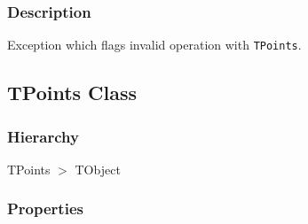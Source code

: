 \documentclass[12pt,a4paper,oneside]{report}
\newcommand{\code}[1]{\texttt{#1}}
\begin{document}
\subsubsection{Description}
Exception which flags invalid operation with \code{TPoints}.
 
\subsection{TPoints Class}
\label{lmPointsVec.TPoints}
\subsubsection{Hierarchy}
TPoints {$>$} TObject
\subsubsection{Properties}
\end{document}
